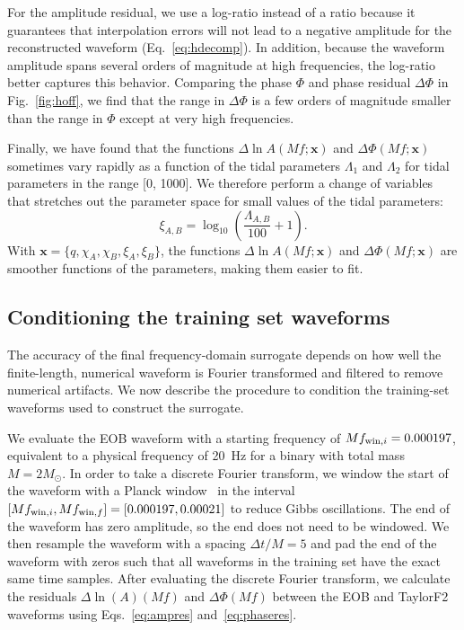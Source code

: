 \documentclass[prd,aps,letter,twocolumn,floatfix,notitlepage,nofootinbib]{revtex4-1}
\def\bx{\mathbf{x}}
\begin{document}
For the amplitude residual, we use a log-ratio instead of a ratio because it guarantees that interpolation errors will not lead to a negative amplitude for the reconstructed waveform (Eq.~\eqref{eq:hdecomp}). In addition, because the waveform amplitude spans several orders of magnitude at high frequencies, the log-ratio better captures this behavior. Comparing the phase $\Phi$ and phase residual $\Delta\Phi$ in Fig.~\ref{fig:hoff}, we find that the range in $\Delta\Phi$ is a few orders of magnitude smaller than the range in $\Phi$ except at very high frequencies. 

Finally, we have found that the functions $\Delta\ln A(Mf; \bx)$ and $\Delta\Phi(Mf; \bx)$ sometimes vary rapidly as a function of the tidal parameters $\Lambda_1$ and $\Lambda_2$ for tidal parameters in the range [0, 1000]. We therefore perform a change of variables that stretches out the parameter space for small values of the tidal parameters:
\begin{equation}
\xi_{A, B} = \log_{10}\left(\frac{\Lambda_{A, B}}{100} + 1\right).
\end{equation}
With $\bx=\{q, \chi_A, \chi_B, \xi_A,\xi_B\}$, the functions $\Delta\ln A(Mf; \bx)$ and $\Delta\Phi(Mf; \bx)$ are smoother functions of the parameters, making them easier to fit.


\subsection{Conditioning the training set waveforms}
\label{sec:condition}

The accuracy of the final frequency-domain surrogate depends on how well the finite-length, numerical waveform is Fourier transformed and filtered to remove numerical artifacts. We now describe the procedure to condition the training-set waveforms used to construct the surrogate.

We evaluate the EOB waveform with a starting frequency of $Mf_{{\rm win}, i}=0.000197$, equivalent to a physical frequency of 20~Hz for a binary with total mass $M=2M_\odot$. In order to take a discrete Fourier transform, we window the start of the waveform with a Planck window~\cite{McKechanRobinsonSathyaprakash2010} in the interval $[Mf_{{\rm win}, i}, Mf_{{\rm win}, f}] = [0.000197, 0.00021]$ to reduce Gibbs oscillations. The end of the waveform has zero amplitude, so the end does not need to be windowed. We then resample the waveform with a spacing $\Delta t/M = 5$ and pad the end of the waveform with zeros such that all waveforms in the training set have the exact same time samples. After evaluating the discrete Fourier transform, we calculate the residuals $\Delta\ln(A)(Mf)$ and $\Delta\Phi(Mf)$ between the EOB and TaylorF2 waveforms using Eqs.~\eqref{eq:ampres} and~\eqref{eq:phaseres}. 
\end{document}
